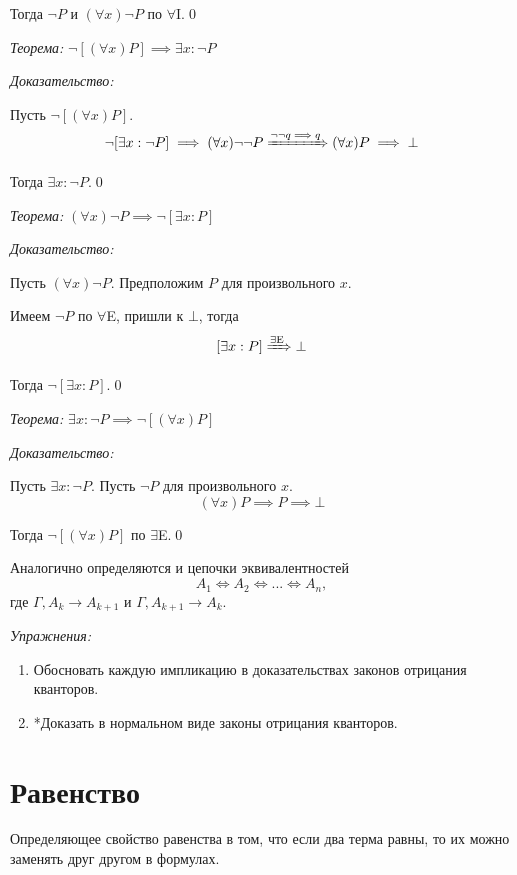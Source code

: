 Тогда $\lnot P$ и $(\forall x)\lnot P$
по $\forall$I.\qed

\pagebreak
{\it Теорема:} $\lnot[(\forall x)P]\implies \exists x:\lnot P$

{\it Доказательство:}

Пусть $\lnot[(\forall x)P]$.
\[
	\lnot[\exists x:\lnot P]\implies (\forall x)\lnot\lnot P
	\xRightarrow{\lnot\lnot q\implies q} (\forall x)P\implies\bot
\]

Тогда $\exists x:\lnot P$.\qed

\vspace{1em}
{\it Теорема:} $(\forall x)\lnot P\implies \lnot[\exists x:P]$

{\it Доказательство:}

Пусть $(\forall x)\lnot P$. Предположим $P$ для произвольного $x$.

Имеем $\lnot P$ по $\forall$E, пришли к $\bot$, тогда
\[
	[\exists x:P]\xRightarrow{\text{$\exists$E}}\bot
\]

Тогда $\lnot[\exists x:P]$.\qed

\vspace{1em}
{\it Теорема:} $\exists x:\lnot P\implies\lnot[(\forall x)P]$

{\it Доказательство:}

Пусть $\exists x:\lnot P$. Пусть $\lnot P$ для произвольного $x$.
\[
	(\forall x)P\implies P\implies \bot
\]

Тогда $\lnot[(\forall x)P]$ по $\exists$E.\qed

\vspace{1em}
Аналогично определяются и цепочки эквивалентностей
\[
	A_1\iff A_2\iff ...\iff A_{n},
\]
где $\Gamma,A_{k}\to A_{k+1}$ и $\Gamma,A_{k+1}\to A_{k}$.

\vspace{1em}
{\it Упражнения:}
\begin{enumerate}
	\item{}Обосновать каждую импликацию в доказательствах законов отрицания кванторов.
	\item{}*Доказать в нормальном виде законы отрицания кванторов.
\end{enumerate}

\section{Равенство}

Определяющее свойство равенства в том, что если два терма равны, то их можно
заменять друг другом в формулах.

